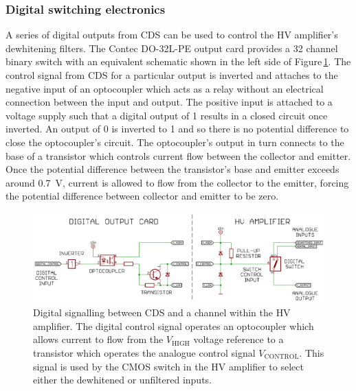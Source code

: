 \subsubsection{Digital switching electronics}
A series of digital outputs from \gls{CDS} can be used to control the \gls{HV} amplifier's dewhitening filters. The Contec DO-32L-PE output card provides a 32 channel binary switch with an equivalent schematic shown in the left side of Figure\,\ref{fig:hv-amp-sigital-switching}. The control signal from \gls{CDS} for a particular output is inverted and attaches to the negative input of an optocoupler which acts as a relay without an electrical connection between the input and output. The positive input is attached to a voltage supply such that a digital output of \num{1} results in a closed circuit once inverted. An output of \num{0} is inverted to \num{1} and so there is no potential difference to close the optocoupler's circuit. The optocoupler's output in turn connects to the base of a transistor which controls current flow between the collector and emitter. Once the potential difference between the transistor's base and emitter exceeds around \SI{0.7}{\volt}, current is allowed to flow from the collector to the emitter, forcing the potential difference between collector and emitter to be zero.

\begin{figure}
  \centering
  \includegraphics[width=\columnwidth]{graphics/60-hv-amp-digital-switching.pdf}
  \caption[Digital signalling between the control and data acquisition system and a channel within the high voltage amplifier]{\label{fig:hv-amp-sigital-switching}Digital signalling between \gls{CDS} and a channel within the \gls{HV} amplifier. The digital control signal operates an optocoupler which allows current to flow from the $V_{\text{HIGH}}$ voltage reference to a transistor which operates the analogue control signal $V_{\text{CONTROL}}$. This signal is used by the \gls{CMOS} switch in the \gls{HV} amplifier to select either the dewhitened or unfiltered inputs.}
\end{figure}

